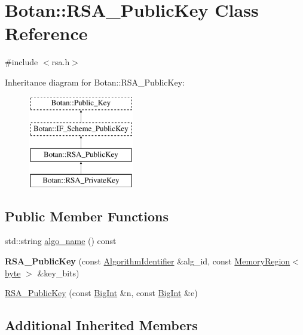 \hypertarget{classBotan_1_1RSA__PublicKey}{\section{Botan\-:\-:R\-S\-A\-\_\-\-Public\-Key Class Reference}
\label{classBotan_1_1RSA__PublicKey}
}


{\ttfamily \#include $<$rsa.\-h$>$}

Inheritance diagram for Botan\-:\-:R\-S\-A\-\_\-\-Public\-Key\-:\begin{figure}[H]
\begin{center}
\leavevmode
\includegraphics[height=4.000000cm]{classBotan_1_1RSA__PublicKey}
\end{center}
\end{figure}
\subsection*{Public Member Functions}
\begin{DoxyCompactItemize}
\item 
std\-::string \hyperlink{classBotan_1_1RSA__PublicKey_a1810770b443edc3c36319cfe3f1c8ec4}{algo\-\_\-name} () const 
\item 
\hypertarget{classBotan_1_1RSA__PublicKey_a05df1f84d2dfe0cf37d903260cb3b223}{{\bfseries R\-S\-A\-\_\-\-Public\-Key} (const \hyperlink{classBotan_1_1AlgorithmIdentifier}{Algorithm\-Identifier} \&alg\-\_\-id, const \hyperlink{classBotan_1_1MemoryRegion}{Memory\-Region}$<$ \hyperlink{namespaceBotan_a7d793989d801281df48c6b19616b8b84}{byte} $>$ \&key\-\_\-bits)}\label{classBotan_1_1RSA__PublicKey_a05df1f84d2dfe0cf37d903260cb3b223}

\item 
\hyperlink{classBotan_1_1RSA__PublicKey_a67c61db5adfdf8ae7428e42c6f9e2e06}{R\-S\-A\-\_\-\-Public\-Key} (const \hyperlink{classBotan_1_1BigInt}{Big\-Int} \&n, const \hyperlink{classBotan_1_1BigInt}{Big\-Int} \&e)
\end{DoxyCompactItemize}
\subsection*{Additional Inherited Members}


